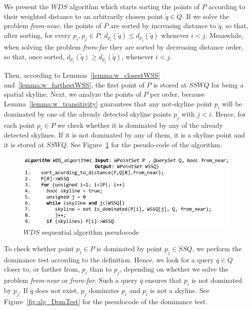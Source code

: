\documentclass[11pt,onecolumn]{elsart3p}
\begin{document}
        We present the $WDS$ algorithm which starts sorting the points of $P$ according to their weighted distance to an arbitrarily chosen point $\tilde{q}\in Q$. If we solve the problem {\it from-near}, the points of $P$ are sorted by increasing distance to $\tilde{q}$, so that, after sorting, for every $p_i, p_j\in P$, $d_{p_i}(\tilde{q}) \le d_{p_j}(\tilde{q})$ whenever $i < j$. Meanwhile, when solving the problem {\it from-far} they are sorted by decreasing distance order, so that, once sorted, $d_{p_i}(\tilde{q}) \ge d_{p_j}(\tilde{q})$, whenever $i < j$.

        Then, according to Lemmas~\ref{lemma:w_closestWSS} and~\ref{lemma:w_farthestWSS}, the first point of $P$ is stored at $SSWQ$ for being a spatial skyline. Next, we analyze the points of $P$ per order, because Lemma~\ref{lemma:w_transitivity} guarantees that any not-skyline point $p_i$ will be dominated by one of the already detected skyline points $p_j$ with $j<i$. Hence, for each point $p_i \in P$ we check whether it is dominated by any of the already detected skylines. If it is not dominated by any of them, it is a skyline point and it is stored at $SSWQ$. See Figure~\ref{fig:alg_seq} for the pseudo-code of the algorithm.

         \begin{figure}[h]
            \begin{center}
            \includegraphics[width=0.75\linewidth]{img/algorithm_DS.eps}
            \caption{ $WDS$ sequential algorithm pseudocode}\label{fig:alg_seq}
            \end{center}
         \end{figure}

        To check whether point $p_i \in P$ is dominated by point $p_j \in SSQ$, we perform the dominance test according to the definition. Hence, we look for a query $\overline{q}\in Q$ closer to, or farther from, $p_i$ than to $p_j$, depending on whether we solve the problem {\it from-near} or {\it from-far}. Such a query $\overline{q}$ ensures that $p_i$ is not dominated by $p_j$. If $\overline{q}$ does not exist, $p_j$ dominates $p_i$ and $p_i$ is not a skyline. See Figure~\ref{fig:alg_DomTest} for the pseudocode of the dominance test.
\end{document}
